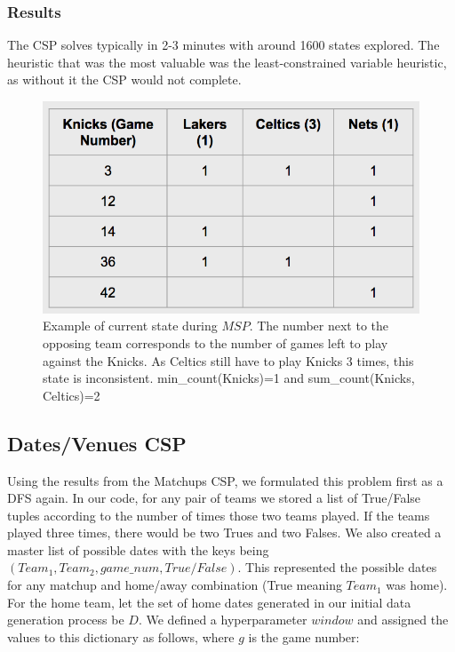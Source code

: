 \documentclass{article}
\begin{document}
	\subsubsection{Results}
	The CSP solves typically in 2-3 minutes with around 1600 states explored. The heuristic that was the most valuable was the least-constrained variable heuristic, as without it the CSP would not complete.

	\begin{figure}
	\caption{Example of current state during $MSP$. The number next to the opposing team corresponds to the number of games left to play against the Knicks. As Celtics still have to play Knicks 3 times, this state is inconsistent.
	min\_count(Knicks)=1 and sum\_count(Knicks, Celtics)=2}
	\includegraphics[scale=0.6]{matchups_game_counts}
	\end{figure}

	\subsection{Dates/Venues CSP}
	Using the results from the Matchups CSP, we formulated this problem first as a DFS again. In our code, for any pair of teams we stored a list of True/False tuples according to the number of times those two teams played. If the teams played three times, there would be two Trues and two Falses. We also created a master list of possible dates with the keys being $(Team_1,Team_2,game\_num,True/False)$. This represented the possible dates for any matchup and home/away combination (True meaning $Team_1$ was home). For the home team, let the set of home dates generated in our initial data generation process be $D$. We defined a hyperparameter $window$ and assigned the values to this dictionary as follows, where $g$ is the game number:
\end{document}
